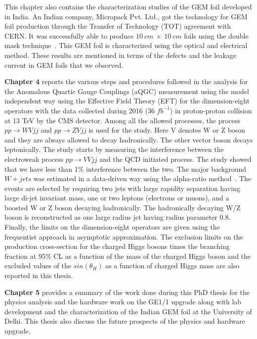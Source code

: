This chapter also contains the characterization studies of the GEM foil developed in India. An Indian company, Micropack Pvt. Ltd., got the technology for GEM foil production through the Transfer of Technology (TOT) agreement with CERN. It was successfully able to produce $10~cm~\times~10~cm$ foils using the double mask technique~\cite{DEOLIVEIRA2009}. This GEM foil is characterized using the optical and electrical method. These results are mentioned in terms of the defects and the leakage current in GEM foils that we observed.


\textbf{Chapter 4} reports the various steps and procedures followed in the analysis for the Anomalous Quartic Gauge Couplings (aQGC) measurement using the model independent way using the Effective Field Theory (EFT) for the dimension-eight operators with the data collected during 2016 (36 $fb^{-1}$) in proton-proton collision at 13 TeV by the CMS detector. Among all the allowed processes, the process $pp \rightarrow WV jj$ and $pp \rightarrow ZV jj$ is used for the study. Here V denotes W or Z boson and they are always allowed to decay hadronically. The other vector boson decays leptonically. The study starts by measuring the interference between the electroweak process $pp \rightarrow VV jj$ and the QCD initiated process. The study showed that we have less than 1\% interference between the two. The major background $W+jets$ was estimated in a data-driven way using the alpha-ratio method~\cite{WVaTGC2016,VV_resonance_2016}. The events are selected by requiring two jets with large rapidity separation having large di-jet invariant mass, one or two leptons (electrons or muons), and a boosted W or Z boson decaying hadronically. The hadronically decaying W/Z boson is reconstructed as one large radius jet having radius parameter 0.8. Finally, the limits on the dimension-eight operators are given using the frequentist approach in asymptotic approximation.
The exclusion limits on the production cross-section for the charged Higgs bosons times the branching fraction at 95\% CL as a function of the mass of the charged Higgs boson and the excluded values of the $sin(\theta_H)$ as a function of charged Higgs mass are also reported in this thesis.


\textbf{Chapter 5} provides a summary of the work done during this PhD thesis for the physics analysis and the hardware work on the GE1/1 upgrade along with lab development and the characterization of the Indian GEM foil at the University of Delhi. This thesis also discuss the future prospects of the physics and hardware upgrade.

